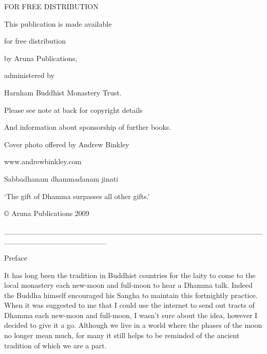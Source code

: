 \documentclass[a4paper,portrait,12pt]{article}
\begin{document}
FOR FREE DISTRIBUTION


This publication is made available


for free distribution


by Aruna Publications,


administered by


Harnham Buddhist Monastery Trust.


Please see note at back for copyright details 


And  information about sponsorship of further books.





Cover photo offered by Andrew Binkley


www.andrewbinkley.com

















Sabbadhanam dhammadanam jinati


`The gift of Dhamma surpasses all other gifts.'


© Aruna Publications 2009











\_\_\_\_\_\_\_\_\_\_\_\_\_\_\_\_\_\_\_\_\_\_\_\_\_\_\_\_\_\_\_\_\_\_\_\_\_\_\_\_\_\_\_\_\_\_\_\_\_\_\_\_\_\_\_\_\_\_\_\_\_\_\_\_\_\_\_





Preface





It has long been the tradition in Buddhist countries for the laity to come to the local monastery each new-moon and full-moon to hear a Dhamma talk. Indeed the Buddha himself encouraged his Sangha to maintain this fortnightly practice. When it was suggested to me that I could use the internet to send out tracts of Dhamma each new-moon and full-moon, I wasn't sure about the idea, however I decided to give it a go. Although we live in a world where the phases of the moon no longer mean much, for many it still helps to be reminded of the ancient tradition of which we are a part. 
\end{document}
